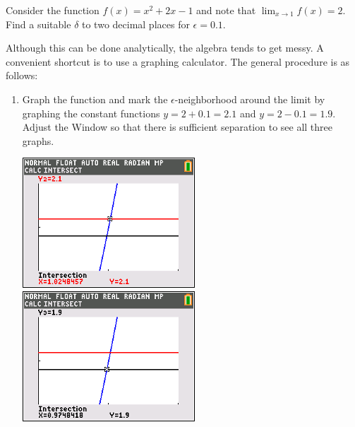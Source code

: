 \documentclass[letterpaper,12pt,fleqn]{article}
\newcommand{\e}{\epsilon}
\renewcommand{\d}{\delta}
\begin{document}
\begin{example}
  Consider the function \(f(x)=x^2+2x-1\) and note that \(\displaystyle\lim_{x\to1}f(x)=2\).  Find a suitable
  \(\d\) to two decimal places for \(\e=0.1\).

  \bigskip

  Although this can be done analytically, the algebra tends to get messy.  A convenient shortcut is to use a
  graphing calculator.  The general procedure is as follows:

  \bigskip

  \begin{enumerate}
  \item Graph the function and mark the \(\e\)-neighborhood around the limit by graphing the constant functions
    \(y=2+0.1=2.1\) and \(y=2-0.1=1.9\).  Adjust the Window so that there is sufficient separation to see all three
    graphs.

    \bigskip

    \includegraphics[scale=0.75]{poly01a}\qquad
    \includegraphics[scale=0.75]{poly01b}

    \bigskip


\end{enumerate}
\end{example}
\end{document}
